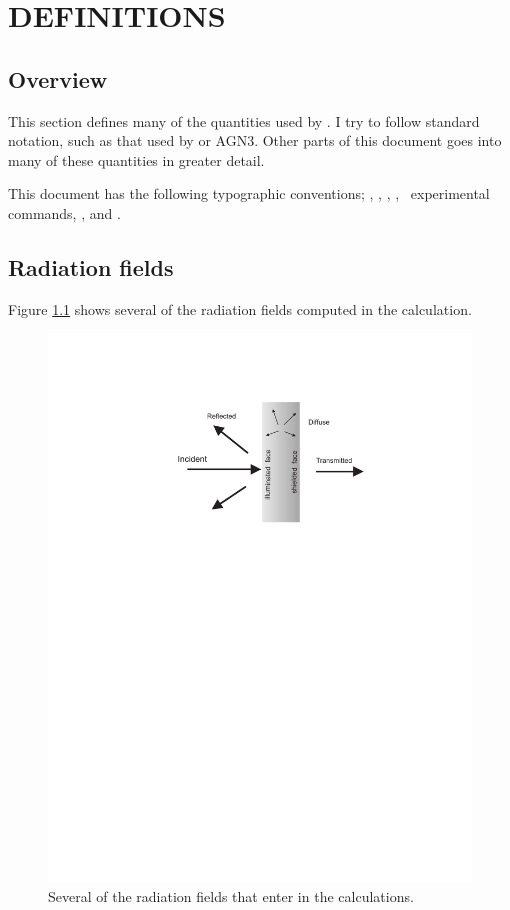 \chapter{DEFINITIONS}

\section{Overview}

This section defines many of the quantities used by \Cloudy.  I try to
follow standard notation, such as that used by \citet{Mihalas1978} or AGN3.
Other parts of this document goes into many of these quantities in greater detail.

This document has the following typographic conventions;
,
,
,
,
\experimental\ experimental commands,
,
and .

\section{Radiation fields}

Figure \ref{fig:radiation_fields} shows several of the
radiation fields computed in the calculation.
\begin{figure}
\centering
\includegraphics{radiation_fields}
\caption[Contributors to total radiation field]{Several of the radiation fields that
enter in the calculations.}
\label{fig:radiation_fields}
\end{figure}

